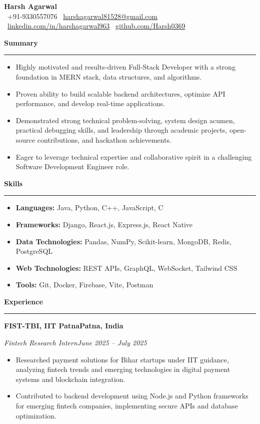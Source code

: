 \documentclass{article}
\newcommand{\sectionheader}[1]{%
  \vspace{1.5ex}\noindent\textbf{\Large #1}%
  \par\rule{\textwidth}{0.8pt}\vspace{0.5ex}%
}
\newcommand{\subheading}[4]{%
  \vspace{0.5ex}\noindent\textbf{#1}\hfill\textbf{#2}\par%
  \noindent\textit{#3}\hfill\textit{#4}\par\vspace{-0.5ex}%
}
\begin{document}
\pagestyle{empty} %

\begin{center}
    \vspace{-0.2in}
    \textbf{\Huge Harsh Agarwal} \\
    \vspace{1pt}
    \small \faPhone\ +91-9330557076 \textbar \faEnvelope\ \href{mailto:harshagarwal81528@gmail.com}{harshagarwal81528@gmail.com} \textbar \faLinkedin\ \href{https://linkedin.com/in/harshagarwal963}{linkedin.com/in/harshagarwal963} \textbar \faGithub\ \href{https://github.com/Harsh0369}{github.com/Harsh0369}
\end{center}

\sectionheader{Summary}
\begin{itemize}[leftmargin=*,noitemsep,topsep=0pt,parsep=0pt,partopsep=0pt]
    \item Highly motivated and results-driven Full-Stack Developer with a strong foundation in MERN stack, data structures, and algorithms.
    \item Proven ability to build scalable backend architectures, optimize API performance, and develop real-time applications.
    \item Demonstrated strong technical problem-solving, system design acumen, practical debugging skills, and leadership through academic projects, open-source contributions, and hackathon achievements.
    \item Eager to leverage technical expertise and collaborative spirit in a challenging Software Development Engineer role.
\end{itemize}

\sectionheader{Skills}
\begin{itemize}[leftmargin=*,noitemsep,topsep=0pt,parsep=0pt,partopsep=0pt]
    \item \textbf{Languages:} Java, Python, C++, JavaScript, C
    \item \textbf{Frameworks:} Django, React.js, Express.js, React Native
    \item \textbf{Data Technologies:} Pandas, NumPy, Scikit-learn, MongoDB, Redis, PostgreSQL
    \item \textbf{Web Technologies:} REST APIs, GraphQL, WebSocket, Tailwind CSS
    \item \textbf{Tools:} Git, Docker, Firebase, Vite, Postman
\end{itemize}

\sectionheader{Experience}
\subheading{FIST-TBI, IIT Patna}{Patna, India}
            {Fintech Research Intern}{June 2025 – July 2025}
\begin{itemize}[leftmargin=*,noitemsep,topsep=0pt,parsep=0pt,partopsep=0pt]
    \item Researched payment solutions for Bihar startups under IIT guidance, analyzing fintech trends and emerging technologies in digital payment systems and blockchain integration.
    \item Contributed to backend development using Node.js and Python frameworks for emerging fintech companies, implementing secure APIs and database optimization.
\end{itemize}
\end{document}
